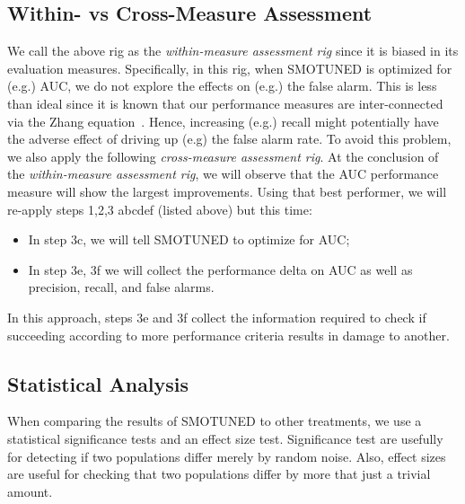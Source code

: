 \documentclass[10pt,conference]{IEEEtran}
\newcommand{\bi}{\begin{itemize}[leftmargin=0.4cm]}
\newcommand{\ei}{\end{itemize}}
\theoremstyle{break}
\theoremstyle{break}
\begin{document}
\subsection{Within- vs Cross-Measure Assessment}
We call the above rig as the {\em within-measure assessment rig} since it is  biased in its evaluation measures. Specifically,  in this rig,
when SMOTUNED is optimized for (e.g.) AUC, we do not explore the effects on (e.g.) the false alarm. This is less than ideal
since it is known that our performance measures are inter-connected via the Zhang equation~\cite{zhang2007comments}. Hence, increasing (e.g.) recall might potentially have the adverse
effect of  driving up (e.g) the false alarm rate. 
To avoid this problem, we also apply the following {\em cross-measure assessment rig}.
At the conclusion of the {\em within-measure assessment rig}, we will observe  that the AUC performance measure will show the largest improvements. Using that best performer, we will re-apply steps 1,2,3 abcdef (listed above) but this time:
\bi
\item In step 3c, we will tell SMOTUNED to optimize for AUC;
\item In step 3e, 3f we will collect the performance delta on AUC as well as precision, recall,
and false alarms.
\ei
In this approach, steps 3e and 3f collect the information required   to check if succeeding according to more performance criteria results in damage to another.


\subsection{Statistical Analysis}

When comparing the results of SMOTUNED to other
treatments, we use a statistical
significance tests and an effect size test.
Significance test are usefully for detecting if two populations
differ merely by random noise. 
Also, effect sizes are useful for checking that two populations differ by more that just a trivial amount.
\end{document}
